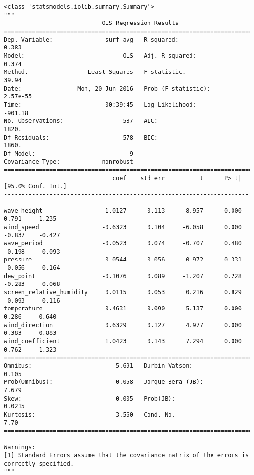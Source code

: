 \documentclass[11pt]{article}
\begin{document}
    
    \begin{verbatim}
<class 'statsmodels.iolib.summary.Summary'>
"""
                            OLS Regression Results                            
==============================================================================
Dep. Variable:               surf_avg   R-squared:                       0.383
Model:                            OLS   Adj. R-squared:                  0.374
Method:                 Least Squares   F-statistic:                     39.94
Date:                Mon, 20 Jun 2016   Prob (F-statistic):           2.57e-55
Time:                        00:39:45   Log-Likelihood:                -901.18
No. Observations:                 587   AIC:                             1820.
Df Residuals:                     578   BIC:                             1860.
Df Model:                           9                                         
Covariance Type:            nonrobust                                         
============================================================================================
                               coef    std err          t      P>|t|      [95.0% Conf. Int.]
--------------------------------------------------------------------------------------------
wave_height                  1.0127      0.113      8.957      0.000         0.791     1.235
wind_speed                  -0.6323      0.104     -6.058      0.000        -0.837    -0.427
wave_period                 -0.0523      0.074     -0.707      0.480        -0.198     0.093
pressure                     0.0544      0.056      0.972      0.331        -0.056     0.164
dew_point                   -0.1076      0.089     -1.207      0.228        -0.283     0.068
screen_relative_humidity     0.0115      0.053      0.216      0.829        -0.093     0.116
temperature                  0.4631      0.090      5.137      0.000         0.286     0.640
wind_direction               0.6329      0.127      4.977      0.000         0.383     0.883
wind_coefficient             1.0423      0.143      7.294      0.000         0.762     1.323
==============================================================================
Omnibus:                        5.691   Durbin-Watson:                   0.105
Prob(Omnibus):                  0.058   Jarque-Bera (JB):                7.679
Skew:                           0.005   Prob(JB):                       0.0215
Kurtosis:                       3.560   Cond. No.                         7.70
==============================================================================

Warnings:
[1] Standard Errors assume that the covariance matrix of the errors is correctly specified.
"""
    \end{verbatim}
\end{document}
